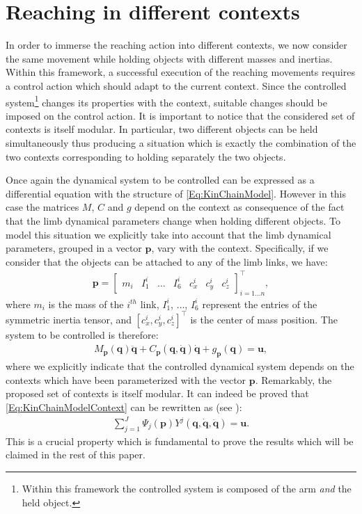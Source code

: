 \documentclass{svmult}
\begin{document}
\section{Reaching in different contexts}

In order to immerse the reaching action into different contexts,
we now consider the same movement while holding objects with
different masses and inertias. Within this framework, a successful
execution of the reaching movements requires a control action which
should adapt to the current context. Since the controlled
system\footnote{Within this framework the controlled system is
composed of the arm {\em and} the held object.} changes its properties 
with the context, suitable changes should be imposed on the control action.
It is important to notice that the considered set of contexts is itself
modular. In particular, two different objects can be held simultaneously 
thus producing a situation which is exactly the combination of the two 
contexts corresponding to holding separately the two objects.

Once again the dynamical system to be controlled can be expressed as
a differential equation with the structure of \eqref{Eq:KinChainModel}.
However in this case the matrices $M$, $C$ and $g$ depend on the 
context as consequence of the fact that the limb dynamical 
parameters change when holding different objects. To model this 
situation we explicitly take into account that the limb dynamical parameters, grouped in 
a vector $\mathbf p$, vary with the context. Specifically, if we 
consider that the objects can be attached to any of the limb links,
we have:
\begin{eqnarray}
\mathbf p = \begin{bmatrix} m_i & I^i_1 & \dots & I^i_6  & c^i_x & c^i_y & c^i_z
\end{bmatrix}^\top_{i = 1 \dots n},
\end{eqnarray}
where $m_i$ is the mass of the $i^{th}$ link, $I^i_1$, $\dots$,
$I^i_6$ represent the entries of the symmetric inertia tensor, and
$\left[ c^i_x, c^i_y, c^i_z \right]^\top$ is the center of mass position.
The system to be controlled is therefore:
\begin{eqnarray} \label{Eq:KinChainModelContext}
M_{\mathbf p}(\mathbf{q}) \ddot{\mathbf{q}} + C_{\mathbf
p}(\mathbf{q},\dot{\mathbf{q}})\dot{\mathbf{q}} + g_{\mathbf
p}(\mathbf{q}) = \mathbf{u},
\end{eqnarray}
where we explicitly indicate that the controlled dynamical system
depends on the contexts which have been parameterized with 
the vector $\mathbf p$. Remarkably, the proposed set of contexts 
is itself modular. It can indeed be proved that \eqref{Eq:KinChainModelContext}
can be rewritten as (see \cite{Kozlowski}):
\begin{eqnarray} \label{Eq:ContextModularity}
\sum_{j=1}^J \Psi_j(\mathbf p) Y^j(\mathbf q, \dot{\mathbf q},
\ddot{\mathbf q}) = \mathbf u.
\end{eqnarray}
This is a crucial property which is fundamental to prove the results
which will be claimed in the rest of this paper.
\end{document}
